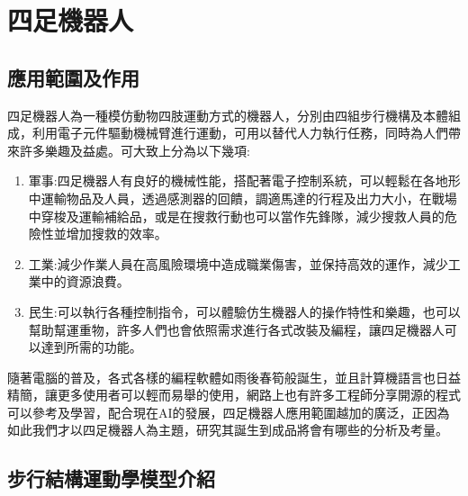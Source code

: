 
\chapter{四足機器人}
\section{應用範圍及作用}
四足機器人為一種模仿動物四肢運動方式的機器人，分別由四組步行機構及本體組成，利用電子元件驅動機械臂進行運動，可用以替代人力執行任務，同時為人們帶來許多樂趣及益處。可大致上分為以下幾項:\
\begin{enumerate}
\item 軍事:四足機器人有良好的機械性能，搭配著電子控制系統，可以輕鬆在各地形中運輸物品及人員，透過感測器的回饋，調適馬達的行程及出力大小，在戰場中穿梭及運輸補給品，或是在搜救行動也可以當作先鋒隊，減少搜救人員的危險性並增加搜救的效率。\
\item 工業:減少作業人員在高風險環境中造成職業傷害，並保持高效的運作，減少工業中的資源浪費。\
\item 民生:可以執行各種控制指令，可以體驗仿生機器人的操作特性和樂趣，也可以幫助幫運重物，許多人們也會依照需求進行各式改裝及編程，讓四足機器人可以達到所需的功能。\
\end{enumerate}
隨著電腦的普及，各式各樣的編程軟體如雨後春筍般誕生，並且計算機語言也日益精簡，讓更多使用者可以輕而易舉的使用，網路上也有許多工程師分享開源的程式可以參考及學習，配合現在AI的發展，四足機器人應用範圍越加的廣泛，正因為如此我們才以四足機器人為主題，研究其誕生到成品將會有哪些的分析及考量。\\[6pt]
\newpage
\section{步行結構運動學模型介紹}

